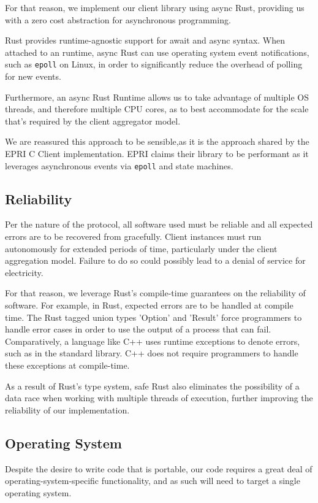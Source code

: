 For that reason, we implement our client library using async Rust, providing us with a zero cost abstraction for asynchronous programming.

Rust provides runtime-agnostic support for await and async syntax.
When attached to an runtime, async Rust can use operating system event notifications, such as \texttt{epoll} on Linux, in order to significantly reduce the overhead of polling for new events.

Furthermore, an async Rust Runtime allows us to take advantage of multiple OS threads, and therefore multiple CPU cores, as to best accommodate for the scale that's required by the client aggregator model.

We are reassured this approach to be sensible,as it is the approach shared by the EPRI C Client implementation. EPRI claims their library to be performant as it leverages asynchronous events via \texttt{epoll} and state machines.


\subsection{Reliability}
Per the nature of the protocol, all software used must be reliable and all expected errors are to be recovered from gracefully. Client instances must run autonomously for extended periods of time, particularly under the client aggregation model. Failure to do so could possibly lead to a denial of service for electricity.

For that reason, we leverage Rust's compile-time guarantees on the reliability of software. For example, in Rust, expected errors are to be handled at compile time. The Rust tagged union types 'Option' and 'Result' force programmers to handle error cases in order to use the output of a process that can fail. Comparatively, a language like C++ uses runtime exceptions to denote errors, such as in the standard library. C++ does not require programmers to handle these exceptions at compile-time.

As a result of Rust's type system, safe Rust also eliminates the possibility of a data race when working with multiple threads of execution, further improving the reliability of our implementation.

\subsection{Operating System}
Despite the desire to write code that is portable, our code requires a great deal of operating-system-specific functionality, and as such will need to target a single operating system. 

